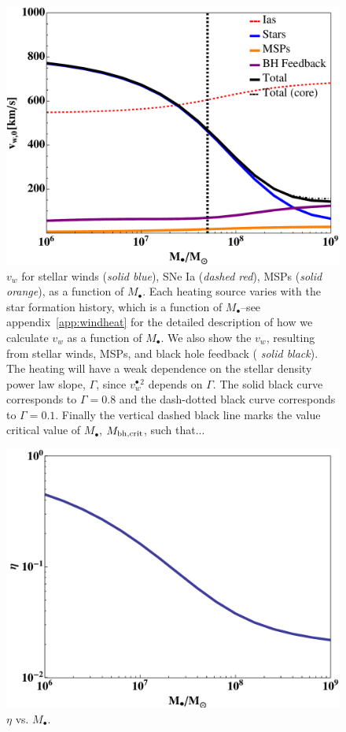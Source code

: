 \documentclass[usenatbib,fleqn]{mn2e}
\newcommand{\Mbh}[1][]{M_{\bullet#1}}
\newcommand{\vwO}{v_{w}}
\begin{document}
\begin{figure}
\includegraphics[width=\columnwidth]{vwSources.pdf}
\caption{\label{fig:vwSources} $\vwO$ for stellar winds ({\it solid
    blue}), SNe Ia ({\it dashed red}), MSPs ({\it solid orange}), as a
  function of $\Mbh$. Each heating source varies with the star
  formation history, which is a function of $\Mbh$--see
  appendix~\ref{app:windheat} for the detailed description of how we
  calculate $\vwO$ as a function of $\Mbh$. We also show the $\vwO$,
  resulting from stellar winds, MSPs, and black hole feedback ({\it
    solid black}). The heating will have a weak dependence on the
  stellar density power law slope, $\Gamma$, since $v_{w}^{\bullet \,
    2}$ depends on $\Gamma$. The solid black curve corresponds to
  $\Gamma=0.8$ and the dash-dotted black curve corresponds to
  $\Gamma=0.1$. Finally the vertical dashed black line marks the value
  critical value of $\Mbh$, $M_{\rm bh, crit}$, such that... }
\end{figure}

\begin{figure}
\includegraphics[width=\columnwidth]{eta.pdf}
\caption{\label{fig:eta} $\eta$ vs. $\Mbh$.}
\end{figure}
\end{document}
